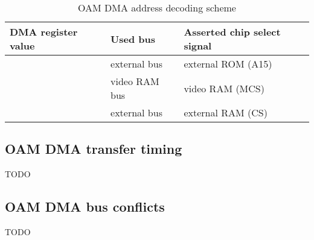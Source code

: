 \documentclass[\main/gbctr.tex]{subfiles}
\begin{document}
\begin{table}[H]
  \caption{OAM DMA address decoding scheme}
  \rmfamily
  \begin{tabularx}{\linewidth}{|L|L|L|}
    \hline
    DMA register value & Used bus      & Asserted chip select signal \\
    \hline
      & external bus  & external ROM (A15)          \\
    \hline
      & video RAM bus & video RAM (MCS)             \\
    \hline
      & external bus  & external RAM (CS)           \\
    \hline
  \end{tabularx}{\parfillskip=0pt\par}
\end{table}

\subsection{OAM DMA transfer timing}

TODO

\subsection{OAM DMA bus conflicts}

TODO
\end{document}
